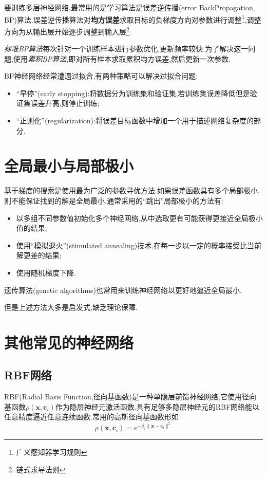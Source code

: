 要训练多层神经网络,最常用的是学习算法是误差逆传播(error BackPropagation, BP)算法.误差逆传播算法对\textbf{均方误差}求取目标的负梯度方向对参数进行调整\footnote{广义感知器学习规则},调整方向为从输出层开始逐步调整到输入层\footnote{链式求导法则}.

\textit{标准BP算法}每次针对一个训练样本进行参数优化,更新频率较快.为了解决这一问题,使用\textit{累积BP算法},即对所有样本求取累积均方误差,然后更新一次参数.

BP神经网络经常遭遇过拟合,有两种策略可以解决过拟合问题:

\begin{itemize}
\item ``早停''(early stopping):将数据分为训练集和验证集,若训练集误差降低但是验证集误差升高,则停止训练;
\item ``正则化''(regularization):将误差目标函数中增加一个用于描述网络复杂度的部分.
\end{itemize}

\section{全局最小与局部极小}

基于梯度的搜索是使用最为广泛的参数寻优方法.如果误差函数具有多个局部极小,则不能保证找到的解是全局最小.通常采用的``跳出''局部极小的方法有:

\begin{itemize}
\item 以多组不同参数值初始化多个神经网络,从中选取更有可能获得更接近全局极小值的结果;
\item 使用``模拟退火''(stimulated annealing)技术,在每一步以一定的概率接受比当前解更差的结果;
\item 使用随机梯度下降.
\end{itemize}

遗传算法(genetic algorithms)也常用来训练神经网络以更好地逼近全局最小.

但是上述方法大多是启发式,缺乏理论保障.

\section{其他常见的神经网络}

\subsection{RBF网络}

RBF(Radial Basis Function,径向基函数)是一种单隐层前馈神经网络,它使用径向基函数$\rho(\bm x,\bm c_i)$作为隐层神经元激活函数.具有足够多隐层神经元的RBF网络能以任意精度逼近任意连续函数.常用的高斯径向基函数形如
\begin{equation}
    \rho(\bm x,\bm c_i)=e^{-\beta_i\|\bm x-\bm c_i\|^2}
\end{equation}

